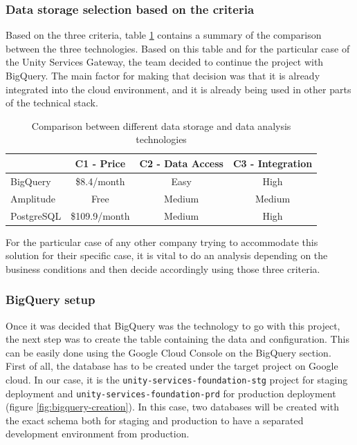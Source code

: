 \documentclass[english, 12pt, a4paper, sci, utf8, a-1b, online]{aaltothesis}
\begin{document}
\subsubsection*{Data storage selection based on the criteria}

Based on the three criteria, table \ref{tab:data-souces} contains a summary of the comparison between the three technologies. Based on this table and for the particular case of the Unity Services Gateway, the team decided to continue the project with BigQuery. The main factor for making that decision was that it is already integrated into the cloud environment, and it is already being used in other parts of the technical stack.\\

\begin{table}[h!]
\centering
\begin{tabular}{|l|c|c|c|}
\hline
           & C1 - Price    & C2 - Data Access & C3 - Integration \\ \hline\hline
BigQuery   & \$8.4/month   & Easy             & High             \\
Amplitude  & Free          & Medium           & Medium           \\
PostgreSQL & \$109.9/month & Medium           & High             \\ \hline 
\end{tabular}
\caption{Comparison between different data storage and data analysis technologies}
\label{tab:data-souces}
\end{table}

For the particular case of any other company trying to accommodate this solution for their specific case, it is vital to do an analysis depending on the business conditions and then decide accordingly using those three criteria.

\subsubsection{BigQuery setup}

Once it was decided that BigQuery was the technology to go with this project, the next step was to create the table containing the data and configuration. This can be easily done using the Google Cloud Console on the BigQuery section.\\

First of all, the database has to be created under the target project on Google cloud. In our case, it is the \texttt{unity-services-foundation-stg} project for staging deployment and \texttt{unity-services-foundation-prd} for production deployment (figure \ref{fig:bigquery-creation}). In this case, two databases will be created with the exact schema both for staging and production to have a separated development environment from production.
\end{document}
